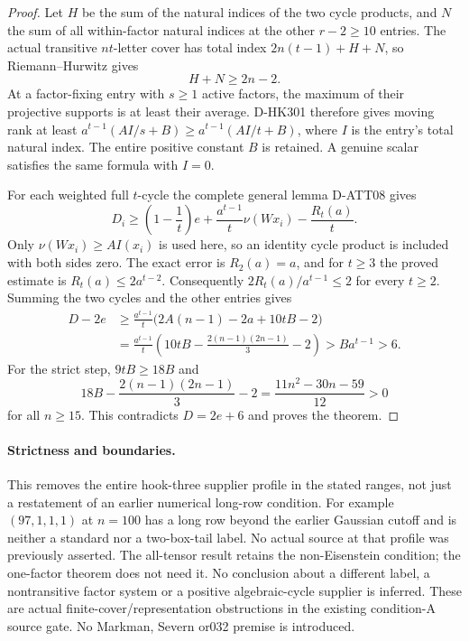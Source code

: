 \begin{proof}
Let $H$ be the sum of the natural indices of the two
cycle products, and $N$ the sum of all within-factor
natural indices at the other $r-2\ge10$ entries.
The actual transitive $nt$-letter cover has total index
$2n(t-1)+H+N$, so Riemann--Hurwitz gives
\[
                             H+N\ge2n-2.
 \tag{HK3.17}
\]
At a factor-fixing entry with $s\ge1$ active factors,
the maximum of their projective supports is at least
their average.  D-HK301 therefore gives moving rank
at least $a^{t-1}(AI/s+B)\ge a^{t-1}(AI/t+B)$,
where $I$ is the entry's total natural index.
The entire positive constant $B$ is retained.
A genuine scalar satisfies the same formula with $I=0$.

For each weighted full $t$-cycle the complete general
lemma D-ATT08 gives
\[
 D_i\ge\left(1-\frac1t\right)e
       +\frac{a^{t-1}}t\nu(Wx_i)-\frac{R_t(a)}t.
 \tag{HK3.18}
\]
Only $\nu(Wx_i)\ge AI(x_i)$ is used here, so an identity
cycle product is included with both sides zero.
The exact error is $R_2(a)=a$, and for $t\ge3$ the
proved estimate is $R_t(a)\le2a^{t-2}$.
Consequently $2R_t(a)/a^{t-1}\le2$ for every $t\ge2$.
Summing the two cycles and the other entries gives
\[
 \begin{split}
 D-2e
 &\ge\frac{a^{t-1}}t
       \bigl(2A(n-1)-2a+10tB-2\bigr)\\
 &=\frac{a^{t-1}}t
       \left(10tB-\frac{2(n-1)(2n-1)}3-2\right)
       >B a^{t-1}>6.
 \end{split}
 \tag{HK3.19}
\]
For the strict step, $9tB\ge18B$ and
\[
 18B-\frac{2(n-1)(2n-1)}3-2
                   =\frac{11n^2-30n-59}{12}>0
 \tag{HK3.20}
\]
for all $n\ge15$.  This contradicts $D=2e+6$
and proves the theorem.
\end{proof}

\paragraph{Strictness and boundaries.}
This removes the entire hook-three supplier profile
in the stated ranges, not just a restatement of an
earlier numerical long-row condition.  For example
$(97,1,1,1)$ at $n=100$ has a long row beyond the
earlier Gaussian cutoff and is neither a standard nor
a two-box-tail label.  No actual source at that profile
was previously asserted.
The all-tensor result retains the non-Eisenstein
condition; the one-factor theorem does not need it.
No conclusion about a different label, a nontransitive
factor system or a positive algebraic-cycle supplier
is inferred.  These are actual finite-cover/representation
obstructions in the existing condition-A source gate.
No Markman, Severn or032 premise is introduced.
